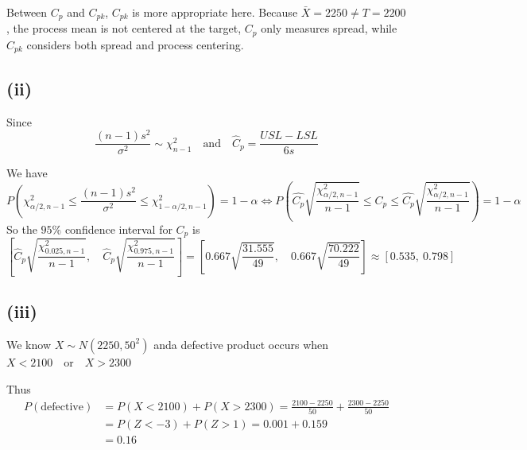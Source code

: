 \documentclass[a4paper, 12pt]{article}  %
\begin{document}
Between \(C_p\) and \(C_{pk}\), \(C_{pk}\) is more appropriate here.
Because $\bar X=2250\ne T=2200$,
the process mean is not centered at the target,
\(C_p\) only measures spread, while \(C_{pk}\) considers both spread and process centering.

\subsection*{(ii)}

Since
$$
\frac{(n-1)s^2}{\sigma^2}\sim \chi^2_{n-1}
\quad \text{and}\quad
\hat C_p=\frac{USL-LSL}{6s}
$$

We have
$$
P\left(\chi^2_{\alpha/2,n-1}\le\frac{(n-1)s^2}{\sigma^2}\le\chi^2_{1-\alpha/2,n-1}\right)=1-\alpha
\iff
P\left(\hat{C_p}\sqrt{\frac{\chi^2_{\alpha/2,n-1}}{n-1}}\le C_p\le \hat{C_p}\sqrt{\frac{\chi^2_{\alpha/2,n-1}}{n-1}}\right)=1-\alpha
$$
So the \(95\%\) confidence interval for \(C_p\) is
$$
\left[
\hat C_p
\sqrt{
\frac{\chi^2_{0.025,n-1}}{n-1}
},
\quad
\hat C_p
\sqrt{
\frac{\chi^2_{0.975,n-1}}{n-1}
}
\right]
=
\left[
0.667\sqrt{\frac{31.555}{49}},
\quad
0.667\sqrt{\frac{70.222}{49}}
\right]
\approx
[0.535,\ 0.798]
$$

\subsection*{(iii)}

We know $X\sim N(2250,50^2)$ anda defective product occurs when $X<2100\quad\text{or}\quad X>2300$

Thus
\begin{align*}
P(\text{defective})
&=P(X<2100)+P(X>2300)
 =\frac{2100-2250}{50}+\frac{2300-2250}{50} \\
&=P(Z<-3)+P(Z>1)
 =0.001+0.159 \\
&=0.16
\end{align*}
\end{document}

